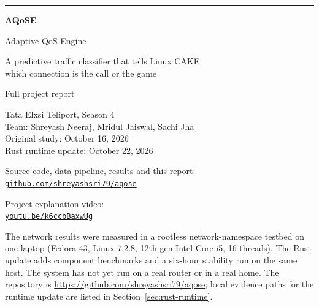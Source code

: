 \documentclass[11pt,a4paper]{article}
\begin{document}
\begin{titlepage}
\vspace*{2.2cm}
{\color{aq}\rule{\linewidth}{1.2pt}}\par\vspace{0.6cm}
{\fontsize{40}{44}\selectfont\bfseries\color{ink} AQoSE}\par\vspace{0.3cm}
{\LARGE\color{ink} Adaptive QoS Engine}\par\vspace{0.4cm}
{\large\color{muted} A predictive traffic classifier that tells Linux CAKE\\ which connection is the call or the game}\par
\vspace{0.6cm}{\color{aq}\rule{\linewidth}{1.2pt}}\par
\vspace{1.2cm}
{\large Full project report}\par\vspace{0.2cm}
{\color{muted} Tata Elxsi Teliport, Season 4\\ Team: Shreyash Neeraj, Mridul Jaiswal, Sachi Jha\\ Original study: October 16, 2026\\ Rust runtime update: October 22, 2026}\par\vspace{0.5cm}
{\small Source code, data pipeline, results and this report:\\ \href{https://github.com/shreyashsri79/aqose}{\texttt{github.com/shreyashsri79/aqose}}}\par\vspace{0.3cm}
{\small Project explanation video:\\ \href{https://youtu.be/k6ccbBaxwUg}{\texttt{youtu.be/k6ccbBaxwUg}}}
\vfill
\begin{minipage}{\linewidth}\small\color{muted}
The network results were measured in a rootless network-namespace testbed on one laptop (Fedora 43, Linux 7.2.8, 12th-gen Intel Core i5, 16 threads). The Rust update adds component benchmarks and a six-hour stability run on the same host. The system has not yet run on a real router or in a real home. The repository is \url{https://github.com/shreyashsri79/aqose}; local evidence paths for the runtime update are listed in Section~\ref{sec:rust-runtime}.
\end{minipage}
\end{titlepage}

\clearpage{}
\end{document}
